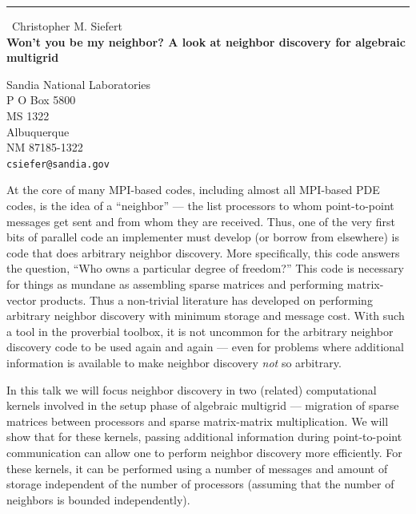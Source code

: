 \documentclass{report}
\begin{document}
\begin{center}
\rule{6in}{1pt} \
{\large Christopher M. Siefert \\
{\bf Won't you be my neighbor? A look at neighbor discovery for algebraic multigrid}}

Sandia National Laboratories \\ P O Box 5800 \\ MS 1322 \\ Albuquerque \\ NM 87185-1322
\\
{\tt csiefer@sandia.gov}\end{center}

At the core of many MPI-based codes, including almost all MPI-based PDE codes,
is the idea of a ``neighbor'' --- the list processors to whom
point-to-point messages get sent and from whom they are received.
Thus, one of the very first bits of parallel code an implementer must
develop (or borrow from elsewhere) is code that does arbitrary
neighbor discovery. More specifically, this code answers the
question, ``Who owns a particular degree of freedom?'' This code is necessary for
things as mundane as assembling sparse matrices and performing
matrix-vector products. Thus a non-trivial
literature has developed on performing arbitrary neighbor discovery
with minimum storage and message cost. With such a tool in the
proverbial toolbox, it is not uncommon for the arbitrary neighbor
discovery code to be used again and again --- even for problems where
additional information is available to make neighbor discovery \textit{not} so
arbitrary.

In this talk we will focus neighbor discovery in two (related)
computational kernels involved in the setup phase of algebraic
multigrid --- migration of sparse matrices between processors and sparse
matrix-matrix multiplication. We will show that for these kernels,
passing additional information during point-to-point communication
can allow one to perform neighbor discovery more efficiently.
For these kernels, it can be performed using a number of
messages and amount of storage independent of the number of processors
(assuming that the number of neighbors is bounded independently).
\end{document}
